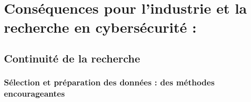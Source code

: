 \chapter{Conséquences pour l'industrie et la recherche en cybersécurité : }
    \section{}
        \subsection{}
            \subsubsection{}
    \section{}
    \section{Continuité de la recherche}
        \subsection{Sélection et préparation des données : des méthodes encourageantes}
